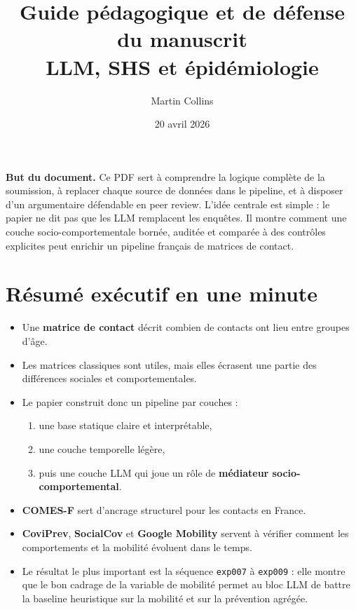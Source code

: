 \documentclass[11pt,a4paper]{article}
\title{Guide pédagogique et de défense du manuscrit\\\large LLM, SHS et épidémiologie}
\author{Martin Collins}
\date{20 avril 2026}
\begin{document}
\sloppy
\maketitle

\begin{center}
\begin{minipage}{0.94\textwidth}
\small
\textbf{But du document.} Ce PDF sert à comprendre la logique complète de la soumission, à replacer chaque source de données dans le pipeline, et à disposer d'un argumentaire défendable en peer review. L'idée centrale est simple : le papier ne dit pas que les LLM remplacent les enquêtes. Il montre comment une couche socio-comportementale bornée, auditée et comparée à des contrôles explicites peut enrichir un pipeline français de matrices de contact.
\end{minipage}
\end{center}

\section{Résumé exécutif en une minute}

\begin{itemize}
\item Une \textbf{matrice de contact} décrit combien de contacts ont lieu entre groupes d'âge.
\item Les matrices classiques sont utiles, mais elles écrasent une partie des différences sociales et comportementales.
\item Le papier construit donc un pipeline par couches :
  \begin{enumerate}
  \item une base statique claire et interprétable,
  \item une couche temporelle légère,
  \item puis une couche LLM qui joue un rôle de \textbf{médiateur socio-comportemental}.
  \end{enumerate}
\item \textbf{COMES-F} sert d'ancrage structurel pour les contacts en France.
\item \textbf{CoviPrev}, \textbf{SocialCov} et \textbf{Google Mobility} servent à vérifier comment les comportements et la mobilité évoluent dans le temps.
\item Le résultat le plus important est la séquence \texttt{exp007} à \texttt{exp009} : elle montre que le bon cadrage de la variable de mobilité permet au bloc LLM de battre la baseline heuristique sur la mobilité et sur la prévention agrégée.
\end{itemize}
\end{document}
